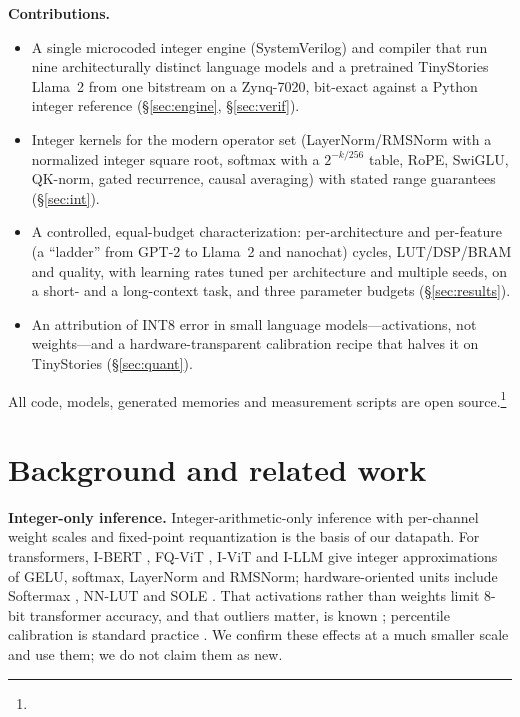 \documentclass[conference]{IEEEtran}
\begin{document}
\textbf{Contributions.}
\begin{itemize}
\item A single microcoded integer engine (SystemVerilog) and compiler that run nine architecturally distinct language
models and a pretrained TinyStories Llama~2 from one bitstream on a Zynq-7020, bit-exact against a Python integer
reference (\S\ref{sec:engine}, \S\ref{sec:verif}).
\item Integer kernels for the modern operator set (LayerNorm/RMSNorm with a normalized integer square root, softmax with
a $2^{-k/256}$ table, RoPE, SwiGLU, QK-norm, gated recurrence, causal averaging) with stated range guarantees
(\S\ref{sec:int}).
\item A controlled, equal-budget characterization: per-architecture and per-feature (a ``ladder'' from GPT-2 to Llama~2
and nanochat) cycles, LUT/DSP/BRAM and quality, with learning rates tuned per architecture and multiple seeds, on a
short- and a long-context task, and three parameter budgets (\S\ref{sec:results}).
\item An attribution of INT8 error in small language models---activations, not weights---and a hardware-transparent
calibration recipe that halves it on TinyStories (\S\ref{sec:quant}).
\end{itemize}
All code, models, generated memories and measurement scripts are open source.\footnote{\zooRepoLink}

\section{Background and related work}\label{sec:related}
\textbf{Integer-only inference.} Integer-arithmetic-only inference with per-channel weight scales and fixed-point
requantization \cite{jacob2018integer,krishnamoorthi2018quantizing,wu2020integer,nagel2021white} is the basis of our
datapath. For transformers, I-BERT \cite{kim2021ibert}, FQ-ViT \cite{lin2022fqvit}, I-ViT \cite{li2023ivit} and I-LLM
\cite{hu2024illm} give integer approximations of GELU, softmax, LayerNorm and RMSNorm; hardware-oriented units include
Softermax \cite{stevens2021softermax}, NN-LUT \cite{yu2022nnlut} and SOLE \cite{wang2023sole}. That activations rather than
weights limit 8-bit transformer accuracy, and that outliers matter, is known \cite{bondarenko2021understanding,
dettmers2022llmint8,xiao2023smoothquant}; percentile calibration is standard practice \cite{migacz2017tensorrt,
mckinstry2019discovering}. We confirm these effects at a much smaller scale and use them; we do not claim them as new.
\end{document}
